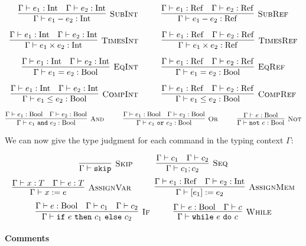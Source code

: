\documentclass{article}
\newcommand{\Rule}[3]{\infer[\textsc{#1}]{#2}{#3}}
\newcommand{\Ref}{\mathrm{Ref}}
\newcommand{\Int}{\mathrm{Int}}
\newcommand{\Bool}{\mathrm{Bool}}
\begin{document}
\[
\Rule{SubInt}{\Gamma \vdash e_1 - e_2: \Int}{\Gamma \vdash e_1: \Int \quad \Gamma \vdash e_2: \Int}
\hspace*{1cm}
\Rule{SubRef}{\Gamma \vdash e_1 - e_2: \Ref}{\Gamma \vdash e_1: \Ref \quad \Gamma \vdash e_2: \Ref}
\]

\[
\Rule{TimesInt}{\Gamma \vdash e_1 \times e_2: \Int}{\Gamma \vdash e_1: \Int \quad \Gamma \vdash e_2: \Int}
\hspace*{1cm}
\Rule{TimesRef}{\Gamma \vdash e_1 \times e_2: \Ref}{\Gamma \vdash e_1: \Ref \quad \Gamma \vdash e_2: \Ref}
\]

\[
\Rule{EqInt}{\Gamma \vdash e_1 = e_2: \Bool}{\Gamma \vdash e_1: \Int \quad \Gamma \vdash e_2: \Int}
\hspace*{1cm}
\Rule{EqRef}{\Gamma \vdash e_1 = e_2: \Bool}{\Gamma \vdash e_1: \Ref \quad \Gamma \vdash e_2: \Ref}
\]

\[
\Rule{CompInt}{\Gamma \vdash e_1 \leq e_2: \Bool}{\Gamma \vdash e_1: \Int \quad \Gamma \vdash e_2: \Int}
\hspace*{1cm}
\Rule{CompRef}{\Gamma \vdash e_1 \leq e_2: \Bool}{\Gamma \vdash e_1: \Ref \quad \Gamma \vdash e_2: \Ref}
\]

\[
\Rule{And}{\Gamma \vdash e_1~\texttt{and}~e_2: \Bool}{\Gamma \vdash e_1: \Bool \quad \Gamma \vdash e_2: \Bool}
\hspace*{1cm}
\Rule{Or}{\Gamma \vdash e_1~\texttt{or}~e_2: \Bool}{\Gamma \vdash e_1: \Bool \quad \Gamma \vdash e_2: \Bool}
\hspace*{1cm}
\Rule{Not}{\Gamma \vdash \texttt{not}~e: \Bool}{\Gamma \vdash e: \Bool}
\]

We can now give the type judgment for each command in the typing context $\Gamma$:

\[
	\Rule{Skip}{\Gamma \vdash \texttt{skip}}{} \hspace*{1cm}
	\Rule{Seq}{\Gamma \vdash c_1 ; c_2}{\Gamma \vdash c_1 \quad \Gamma \vdash c_2}
\]
\[
	\Rule{AssignVar}{\Gamma \vdash x := e}{\Gamma \vdash x: T \quad \Gamma \vdash e: T} \hspace*{1cm}
	\Rule{AssignMem}{\Gamma \vdash [e_1] := e_2}{\Gamma \vdash e_1: \Ref \quad \Gamma \vdash e_2: \Int}
\]
\[
	\Rule{If}{\Gamma \vdash \texttt{if}~e~\texttt{then}~c_1~\texttt{else}~c_2}{\Gamma \vdash e: \Bool \quad \Gamma \vdash c_1 \quad \Gamma \vdash c_2}
\hspace*{1cm}
	\Rule{While}{\Gamma \vdash \texttt{while}~e~\texttt{do}~c}{\Gamma \vdash e: \Bool \quad \Gamma \vdash c} 
\]


\paragraph{Comments}
\end{document}
